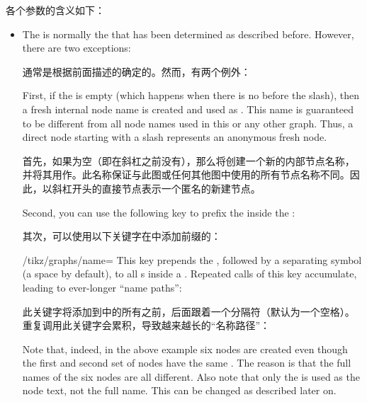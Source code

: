 各个参数的含义如下：
\begin{itemize}
    \item The  is normally the  that has
        been determined as described before. However, there are two exceptions:

        通常是根据前面描述的确定的。然而，有两个例外：

        First, if the  is empty (which happens when there is no
         before the slash), then a fresh internal node name is
        created and used as . This name is guaranteed to
        be different from all node names used in this or any other graph. Thus,
        a direct node starting with a slash represents an anonymous fresh node.

        首先，如果为空（即在斜杠之前没有），那么将创建一个新的内部节点名称，并将其用作。此名称保证与此图或任何其他图中使用的所有节点名称不同。因此，以斜杠开头的直接节点表示一个匿名的新建节点。


        Second, you can use the following key to prefix the 
        inside the :

        其次，可以使用以下关键字在中添加前缀的：


        \begin{key}{/tikz/graphs/name=}
            This key prepends the , followed by a separating symbol
            (a space by default), to all s inside a . Repeated calls of this key accumulate, leading to
            ever-longer ``name paths'':
            
            此关键字将添加到中的所有之前，后面跟着一个分隔符（默认为一个空格）。重复调用此关键字会累积，导致越来越长的“名称路径”：
\begin{codeexample}[preamble={\usetikzlibrary{graphs}}]
\end{codeexample}
            Note that, indeed, in the above example six nodes are created even
            though the first and second set of nodes have the same . The reason is that the full names of the six nodes are all
            different. Also note that only the  is used as the
            node text, not the full name. This can be changed as described
            later on.


\end{key}
\end{itemize}
